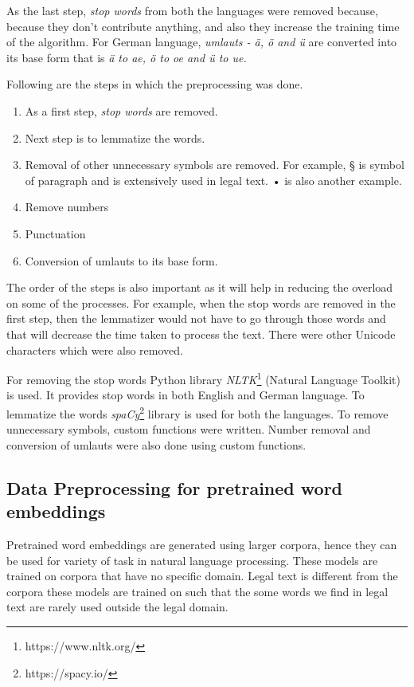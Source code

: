 As the last step, \textit{stop words} from both the languages were removed because, because they don't contribute anything, and also they increase the training time of the algorithm. For German language, \textit{umlauts - ä, ö and ü} are converted into its base form that is \textit{ä to ae, ö to oe and ü to ue.}

Following are the steps in which the preprocessing was done.

\begin{enumerate}
    \item As a first step, \textit{stop words} are removed.
    \item Next step is to lemmatize the words.
    \item Removal of other unnecessary symbols are removed. For example, § is symbol of paragraph and is extensively used in legal text. • is also another example.
    \item Remove numbers
    \item Punctuation 
    \item Conversion of umlauts to its base form.
\end{enumerate}

The order of the steps is also important as it will help in reducing the overload on some of the processes. For example, when the stop words are removed in the first step, then the lemmatizer would not have to go through those words and that will decrease the time taken to process the text. There were other Unicode characters which were also removed.

For removing the stop words Python library \textit{NLTK}\footnote{https://www.nltk.org/} (Natural Language Toolkit) is used. It provides stop words in both English and German language. To lemmatize the words \textit{spaCy}\footnote{https://spacy.io/} library is used for both the languages. To remove unnecessary symbols, custom functions were written. Number removal and conversion of umlauts were also done using custom functions.

\iffalse


\subsection{Data Preprocessing for pretrained word embeddings}
Pretrained word embeddings are generated using larger corpora, hence they can be used for variety of task in natural language processing. These models are trained on corpora that have no specific domain. Legal text is different from the corpora these models are trained on such that the some words we find in legal text are rarely used outside the legal domain. 

